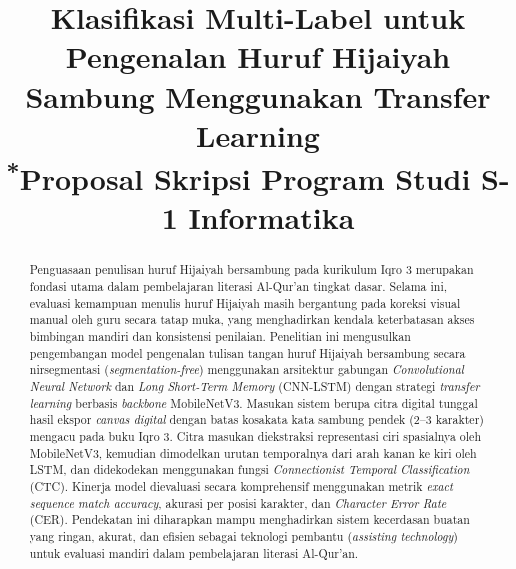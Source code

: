 \documentclass[conference]{IEEEtran}
\begin{document}
\title{Klasifikasi Multi-Label untuk Pengenalan Huruf Hijaiyah Sambung Menggunakan Transfer Learning\\
{\footnotesize \textsuperscript{*}Proposal Skripsi Program Studi S-1 Informatika}
}

\author{
\and
{}
}

\maketitle

\begin{abstract}
Penguasaan penulisan huruf Hijaiyah bersambung pada kurikulum Iqro 3 merupakan fondasi utama dalam pembelajaran literasi Al-Qur'an tingkat dasar. Selama ini, evaluasi kemampuan menulis huruf Hijaiyah masih bergantung pada koreksi visual manual oleh guru secara tatap muka, yang menghadirkan kendala keterbatasan akses bimbingan mandiri dan konsistensi penilaian. Penelitian ini mengusulkan pengembangan model pengenalan tulisan tangan huruf Hijaiyah bersambung secara nirsegmentasi (\textit{segmentation-free}) menggunakan arsitektur gabungan \textit{Convolutional Neural Network} dan \textit{Long Short-Term Memory} (CNN-LSTM) dengan strategi \textit{transfer learning} berbasis \textit{backbone} MobileNetV3. Masukan sistem berupa citra digital tunggal hasil ekspor \textit{canvas digital} dengan batas kosakata kata sambung pendek (2--3 karakter) mengacu pada buku Iqro 3. Citra masukan diekstraksi representasi ciri spasialnya oleh MobileNetV3, kemudian dimodelkan urutan temporalnya dari arah kanan ke kiri oleh LSTM, dan didekodekan menggunakan fungsi \textit{Connectionist Temporal Classification} (CTC). Kinerja model dievaluasi secara komprehensif menggunakan metrik \textit{exact sequence match accuracy}, akurasi per posisi karakter, dan \textit{Character Error Rate} (CER). Pendekatan ini diharapkan mampu menghadirkan sistem kecerdasan buatan yang ringan, akurat, dan efisien sebagai teknologi pembantu (\textit{assisting technology}) untuk evaluasi mandiri dalam pembelajaran literasi Al-Qur'an.
\end{abstract}
\end{document}

